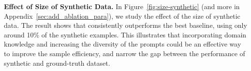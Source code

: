 \begin{figure}[t!]
    \centering
    \begin{minipage}{0.48\textwidth}
        \centering
         \hspace{-3mm}
        \vspace{-2ex}
    \end{minipage}%
    \begin{minipage}{0.48\textwidth}
        \centering
         \hspace{-6mm}
        \vspace{-2ex}
    \end{minipage}%
    \vspace{-0.5ex}
\end{figure}



\textbf{Effect of Size of Synthetic Data.}
In Figure~\ref{fig:size-synthetic} (and more in Appendix~\ref{sec:add_ablation_para}), we study the effect of the size of synthetic data. The result shows that {\ours} consistently outperforms the best baseline, using only around 10\% of the synthetic examples. This illustrates that incorporating domain knowledge and increasing the diversity of the prompts could be an effective way to improve the sample efficiency, and narrow the gap between the performance of synthetic and ground-truth dataset.


